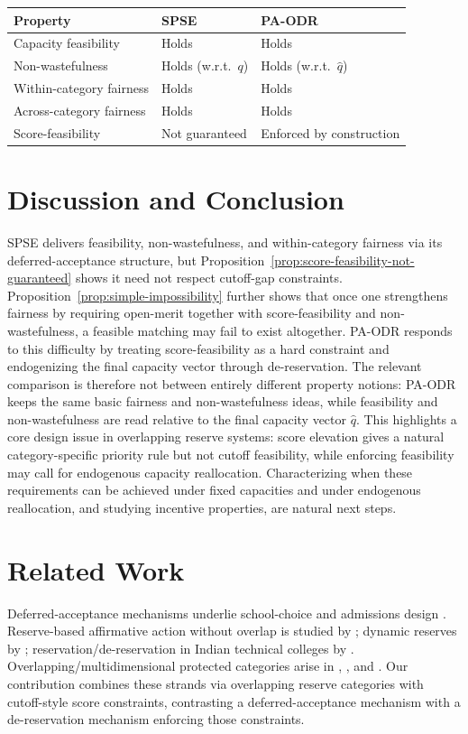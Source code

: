 \documentclass[10pt]{article}
\newcommand{\1}{\mathbf{1}}
\begin{document}
\begin{center}
\renewcommand{\arraystretch}{1.3}
\begin{tabular}{lll}
\toprule
\textbf{Property} & \textbf{SPSE} & \textbf{PA-ODR} \\
\midrule
Capacity feasibility & Holds & Holds \\
Non-wastefulness & Holds (w.r.t.\ $q$) & Holds (w.r.t.\ $\hat q$) \\
Within-category fairness & Holds & Holds \\
Across-category fairness & Holds & Holds \\
Score-feasibility & Not guaranteed & Enforced by construction \\
\bottomrule
\end{tabular}
\end{center}

\section{Discussion and Conclusion}
SPSE delivers feasibility, non-wastefulness, and within-category fairness via its deferred-acceptance structure, but Proposition~\ref{prop:score-feasibility-not-guaranteed} shows it need not respect cutoff-gap constraints. Proposition~\ref{prop:simple-impossibility} further shows that once one strengthens fairness by requiring open-merit together with score-feasibility and non-wastefulness, a feasible matching may fail to exist altogether. PA-ODR responds to this difficulty by treating score-feasibility as a hard constraint and endogenizing the final capacity vector through de-reservation. The relevant comparison is therefore not between entirely different property notions: PA-ODR keeps the same basic fairness and non-wastefulness ideas, while feasibility and non-wastefulness are read relative to the final capacity vector $\hat q$. This highlights a core design issue in overlapping reserve systems: score elevation gives a natural category-specific priority rule but not cutoff feasibility, while enforcing feasibility may call for endogenous capacity reallocation. Characterizing when these requirements can be achieved under fixed capacities and under endogenous reallocation, and studying incentive properties, are natural next steps.

\section{Related Work}
Deferred-acceptance mechanisms underlie school-choice and admissions design \citep{GaSh62a,Roth08a,AbSo03b}. Reserve-based affirmative action without overlap is studied by \citet{Abdu05a}; dynamic reserves by \citet{AyTu20a}; reservation/de-reservation in Indian technical colleges by \citet{AyTu23a}. Overlapping/multidimensional protected categories arise in \citet{KHIY17a}, \citet{GKK+17a}, and \citet{AyBo21a}. Our contribution combines these strands via overlapping reserve categories with cutoff-style score constraints, contrasting a deferred-acceptance mechanism with a de-reservation mechanism enforcing those constraints.



\end{document}

